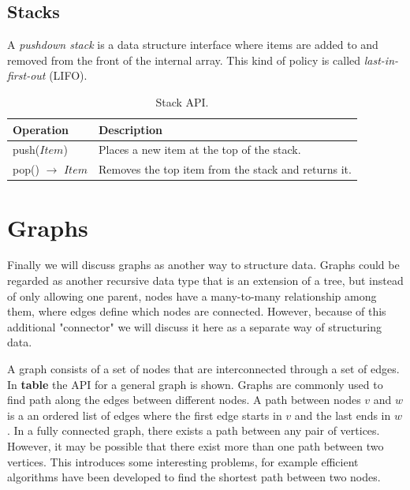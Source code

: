 \subsection{Stacks}

A \emph{pushdown stack} is a data structure interface where items are added to and removed from the front of the internal array. This kind of policy is called \emph{last-in-first-out} (LIFO).

\begin{table}[H]
	\caption{Stack API.}
	\label{tab:api:stack}
	\begin{tabular}{p{150px} | p{250px}}
		\textbf{Operation} & \textbf{Description} \\
		\hline
		push($Item$) & Places a new item at the top of the stack. \\
		pop() $\rightarrow$ $Item$ & Removes the top item from the stack and returns it. \\
		\hline
	\end{tabular}
\end{table}



\section{Graphs}

Finally we will discuss graphs as another way to structure data. Graphs could be regarded as another recursive data type that is an extension of a tree, but instead of only allowing one parent, nodes have a many-to-many relationship among them, where edges define which nodes are connected. However, because of this additional "connector" we will discuss it here as a separate way of structuring data.

A graph consists of a set of nodes that are interconnected through a set of edges. In \textbf{table} the API for a general graph is shown. Graphs are commonly used to find path along the edges between different nodes. A path between nodes $v$ and $w$ is a an ordered list of edges where the first edge starts in $v$ and the last ends in $w$. In a fully connected graph, there exists a path between any pair of vertices. However, it may be possible that there exist more than one path between two vertices. This introduces some interesting problems, for example efficient algorithms have been developed to find the shortest path between two nodes.

